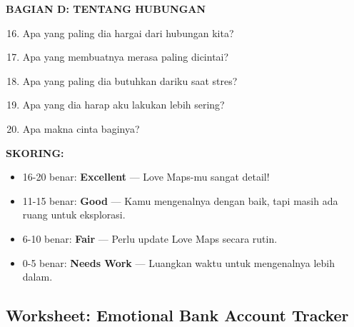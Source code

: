 \begin{exercisebox}
\textbf{BAGIAN D: TENTANG HUBUNGAN}

\begin{enumerate}[itemsep=0.2cm]
    \setcounter{enumi}{15}
    \item Apa yang paling dia hargai dari hubungan kita? \hrulefill
    \item Apa yang membuatnya merasa paling dicintai? \hrulefill
    \item Apa yang paling dia butuhkan dariku saat stres? \hrulefill
    \item Apa yang dia harap aku lakukan lebih sering? \hrulefill
    \item Apa makna cinta baginya? \hrulefill
\end{enumerate}

\vspace{0.3cm}
\textbf{SKORING:}
\begin{itemize}[itemsep=0.1cm]
    \item 16-20 benar: \textbf{Excellent} --- Love Maps-mu sangat detail!
    \item 11-15 benar: \textbf{Good} --- Kamu mengenalnya dengan baik, tapi masih ada ruang untuk eksplorasi.
    \item 6-10 benar: \textbf{Fair} --- Perlu update Love Maps secara rutin.
    \item 0-5 benar: \textbf{Needs Work} --- Luangkan waktu untuk mengenalnya lebih dalam.
\end{itemize}
\end{exercisebox}

\subsection{Worksheet: Emotional Bank Account Tracker}

